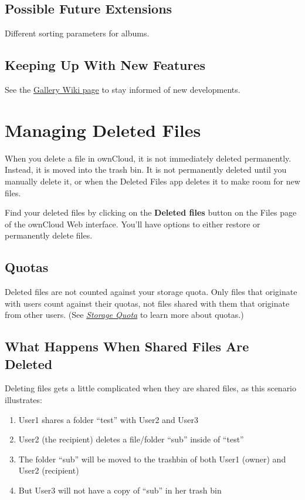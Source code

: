 \documentclass[letterpaper,10pt,english]{sphinxmanual}
\begin{document}
\subsection{Possible Future Extensions}
\label{files/gallery_app:possible-future-extensions}
Different sorting parameters for albums.


\subsection{Keeping Up With New Features}
\label{files/gallery_app:keeping-up-with-new-features}
See the \href{https://github.com/owncloud/gallery/wiki}{Gallery Wiki page} to stay informed of new developments.


\section{Managing Deleted Files}
\label{files/deleted_file_management:managing-deleted-files}\label{files/deleted_file_management::doc}
When you delete a file in ownCloud, it is not immediately deleted permanently.
Instead, it is moved into the trash bin. It is not permanently deleted until
you manually delete it, or when the Deleted Files app deletes it to make room
for new files.

Find your deleted files by clicking on the \textbf{Deleted files}
button on the Files page of the ownCloud Web interface. You'll have options to
either restore or permanently delete files.


\subsection{Quotas}
\label{files/deleted_file_management:quotas}
Deleted files are not counted against your storage quota. Only files that
originate with users count against their quotas, not files
shared with them that originate from other users. (See {\hyperref[files/quota::doc]{\emph{\emph{Storage Quota}}}} to learn
more about quotas.)


\subsection{What Happens When Shared Files Are Deleted}
\label{files/deleted_file_management:what-happens-when-shared-files-are-deleted}
Deleting files gets a little complicated when they are shared files, as this
scenario illustrates:
\begin{enumerate}
\item {} 
User1 shares a folder ``test'' with User2 and User3

\item {} 
User2 (the recipient) deletes a file/folder ``sub'' inside of ``test''

\item {} 
The folder ``sub'' will be moved to the trashbin of both User1 (owner) and
User2 (recipient)

\item {} 
But User3 will not have a copy of ``sub'' in her trash bin

\end{enumerate}
\end{document}
